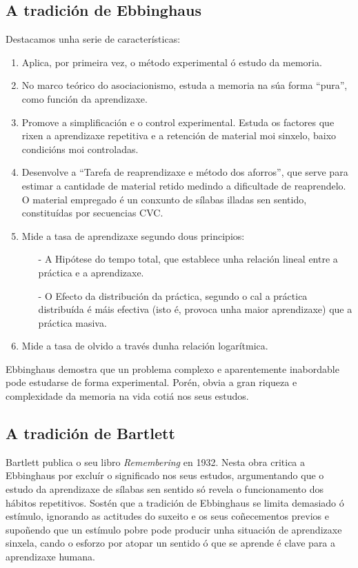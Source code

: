 \documentclass[a4paper,11pt]{article}
\begin{document}
\subsection{A tradición de Ebbinghaus}
Destacamos unha serie de características:
\begin{enumerate}
	\item Aplica, por primeira vez, o método experimental ó estudo da memoria.
	\item No marco teórico do asociacionismo, estuda a memoria na súa forma ``pura'', como función da 	aprendizaxe.
	\item Promove a simplificación e o control experimental. Estuda os factores que rixen a 				aprendizaxe repetitiva e a retención de material moi sinxelo, baixo condicións moi controladas. 
	\item Desenvolve a ``Tarefa de reaprendizaxe e método dos aforros'', que serve para estimar a 			cantidade de material retido medindo a dificultade de reaprendelo. O material empregado é un 			conxunto de sílabas illadas sen sentido, constituídas por secuencias CVC.
	\item Mide a tasa de aprendizaxe segundo dous principios:
	\begin{itemize}
		\item[-] A Hipótese do tempo total, que establece unha relación lineal entre a práctica e a 			aprendizaxe.
		\item[-] O Efecto da distribución da práctica, segundo o cal a práctica distribuída é máis 				efectiva (isto é, provoca unha maior aprendizaxe) que a práctica masiva.
	\end{itemize}
	\item Mide a tasa de olvido a través dunha relación logarítmica.
\end{enumerate}

Ebbinghaus demostra que un problema complexo e aparentemente inabordable pode estudarse de forma experimental. Porén, obvia a gran riqueza e complexidade da memoria na vida cotiá nos seus estudos.

\subsection{A tradición de Bartlett}
Bartlett publica o seu libro \textit{Remembering} en 1932. Nesta obra critica a Ebbinghaus por excluír o significado nos seus estudos, argumentando que o estudo da aprendizaxe de sílabas sen sentido só revela o funcionamento dos hábitos repetitivos. Sostén que a tradición de Ebbinghaus se limita demasiado ó estímulo, ignorando as actitudes do suxeito e os seus coñecementos previos e supoñendo que un estímulo pobre pode producir unha situación de aprendizaxe sinxela, cando o esforzo por atopar un sentido ó que se aprende é clave para a aprendizaxe humana.
\end{document}
